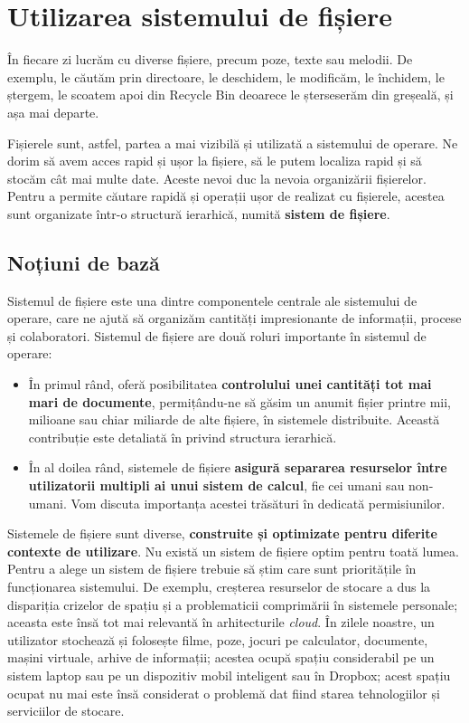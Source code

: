 \chapter{Utilizarea sistemului de fișiere}
\label{ch:fs}

În fiecare zi lucrăm cu diverse fișiere, precum poze, texte sau melodii.
De exemplu, le căutăm prin directoare, le deschidem, le modificăm, le închidem, le ștergem, le scoatem apoi din Recycle Bin deoarece le șterseserăm din greșeală, și așa mai departe.

Fișierele sunt, astfel, partea a mai vizibilă și utilizată a sistemului de operare.
Ne dorim să avem acces rapid și ușor la fișiere, să le putem localiza rapid și să stocăm cât mai multe date.
Aceste nevoi duc la nevoia organizării fișierelor.
Pentru a permite căutare rapidă și operații ușor de realizat cu fișierele, acestea sunt organizate într-o structură ierarhică, numită \textbf{sistem de fișiere}.

\section{Noțiuni de bază}
\label{sec:fs:concepts}

Sistemul de fișiere este una dintre componentele centrale ale sistemului de operare, care ne ajută să organizăm cantități impresionante de informații, procese și colaboratori.
Sistemul de fișiere are două roluri importante în sistemul de operare:

\begin{itemize}
  \item În primul rând, oferă posibilitatea \textbf{controlului unei cantități tot mai mari de documente}, permițându-ne să găsim un anumit fișier printre mii, milioane sau chiar miliarde de alte fișiere, în sistemele distribuite.
    Această contribuție este detaliată în  privind structura ierarhică.
  \item În al doilea rând, sistemele de fișiere \textbf{asigură separarea resurselor între utilizatorii multipli ai unui sistem de calcul}, fie cei umani sau non-umani.
    Vom discuta importanța acestei trăsături în  dedicată permisiunilor.
\end{itemize}

Sistemele de fișiere sunt diverse, \textbf{construite și optimizate pentru diferite contexte de utilizare}.
Nu există un sistem de fișiere optim pentru toată lumea.
Pentru a alege un sistem de fișiere trebuie să știm care sunt prioritățile în funcționarea sistemului.
De exemplu, creșterea resurselor de stocare a dus la dispariția crizelor de spațiu și a problematicii comprimării în sistemele personale;
aceasta este însă tot mai relevantă în arhitecturile \textit{cloud}.
În zilele noastre, un utilizator stochează și folosește filme, poze, jocuri pe calculator, documente, mașini virtuale, arhive de informații;
acestea ocupă spațiu considerabil pe un sistem laptop sau pe un dispozitiv mobil inteligent sau în Dropbox;
acest spațiu ocupat nu mai este însă considerat o problemă dat fiind starea tehnologiilor și serviciilor de stocare.

